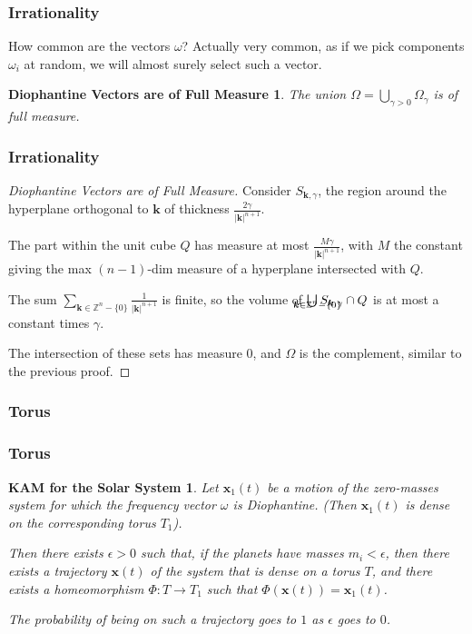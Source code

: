 \documentclass{beamer}
\newcommand{\Z}{\mathbb{Z}}
\newcommand{\bp}[1]{\bm{#1}}
\begin{document}
\begin{frame}
  \frametitle{Irrationality}
  How common are the vectors $\omega$?
  Actually very common, as if we pick components $\omega_i$ at random, we will
  almost surely select such a vector.
  
  \newtheorem{diomeas}{Diophantine Vectors are of Full Measure}
  \begin{diomeas}
    The union $\Omega = \bigcup_{\gamma > 0} \Omega_{\gamma}$ is of full measure.
  \end{diomeas}
\end{frame}

\begin{frame}
  \frametitle{Irrationality}
  \begin{proof}[Diophantine Vectors are of Full Measure]
    Consider $S_{\bp{k}, \gamma}$, the region around the hyperplane orthogonal
    to $\bp{k}$ of thickness $\frac{2\gamma}{|\bp{k}|^{n+1}}$.
    
    The part within the unit cube $Q$ has measure at most
    $\frac{M\gamma}{|\bp{k}|^{n+1}}$, with $M$ the constant giving the max
    $(n-1)$-dim measure of a hyperplane intersected with $Q$.

    The sum $\sum_{\bp{k} \in \Z^n - \{0\}} \frac{1}{|\bp{k}|^{n+1}}$ is finite,
    so the volume of $\bigcup_{\mathclap{\bp{k} \in \Z^n - \{0\}}} S_{\bp{k}, \gamma}
    \cap Q$ is at most a constant times $\gamma$.

    The intersection of these sets has measure $0$, and $\Omega$ is the
    complement, similar to the previous proof.
  \end{proof}
\end{frame}

\begin{frame}
  \frametitle{Torus}
\end{frame}

\begin{frame}
  \frametitle{Torus}
  \newtheorem{kamsolar}{KAM for the Solar System}
  \begin{kamsolar}
    Let $\bp{x}_1(t)$ be a motion of the zero-masses system for which the
    frequency vector $\omega$ is Diophantine.
    (Then $\bp{x}_1(t)$ is dense on the corresponding torus $T_1$).

    Then there exists $\epsilon > 0$ such that, if the planets have masses $m_i
    < \epsilon$, then there exists a trajectory $\bp{x}(t)$ of the system that
    is dense on a torus $T$, and there exists a homeomorphism $\Phi : T \to T_1$
    such that $\Phi(\bp{x}(t)) = \bp{x}_1(t)$.

    The probability of being on such a trajectory goes to $1$ as $\epsilon$ goes
    to $0$.
  \end{kamsolar}
\end{frame}
\end{document}

